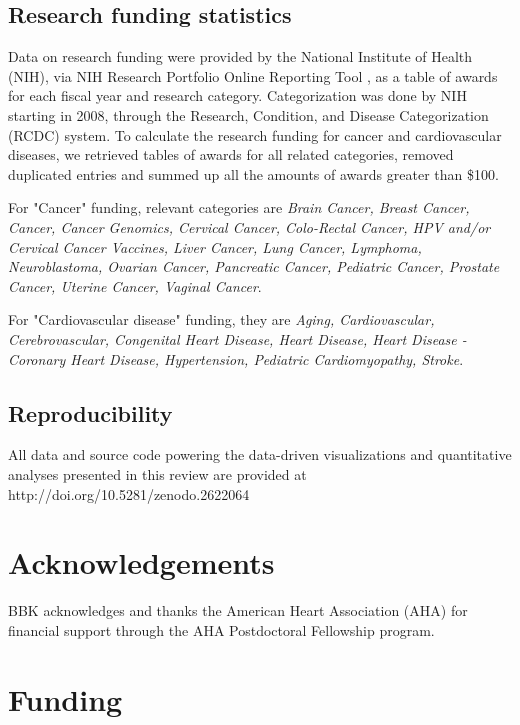 \documentclass[letter]{bib}
\begin{document}
\begin{methods}
    
    \subsection*{Research funding statistics}
Data on research funding were provided by the National Institute of Health (NIH), via NIH Research Portfolio Online Reporting Tool \citep{NationalInstituteofHealth:2018:Estimates}, as a table of awards for each fiscal year and research category. Categorization was done by NIH starting in 2008, through the Research, Condition, and Disease Categorization (RCDC) system. To calculate the research funding for cancer and cardiovascular diseases, we retrieved tables of awards for all related categories, removed duplicated entries and summed up all the amounts of awards greater than \$100.

For "Cancer" funding, relevant categories are \protect\textit{Brain Cancer, Breast Cancer, Cancer, Cancer Genomics, Cervical Cancer, Colo-Rectal Cancer, HPV and/or Cervical Cancer Vaccines, Liver Cancer, Lung Cancer, Lymphoma, Neuroblastoma, Ovarian Cancer, Pancreatic Cancer, Pediatric Cancer, Prostate Cancer, Uterine Cancer, Vaginal Cancer}.

For "Cardiovascular disease" funding, they are {\protect\textit{Aging, Cardiovascular, Cerebrovascular, Congenital Heart Disease, Heart Disease, Heart Disease - Coronary Heart Disease, Hypertension, Pediatric Cardiomyopathy, Stroke}}.

\subsection*{Reproducibility}
 All data and source code powering the data-driven visualizations and quantitative analyses presented in this review are provided at http://doi.org/10.5281/zenodo.2622064
 
\end{methods}
	\enlargethispage{12pt}
	
	
	
	
	\section*{Acknowledgements}
	
	BBK acknowledges and thanks the American Heart Association (AHA) for financial support through the AHA Postdoctoral Fellowship program.
	\vspace*{-12pt}
	
	\section*{Funding}
	
\end{document}
